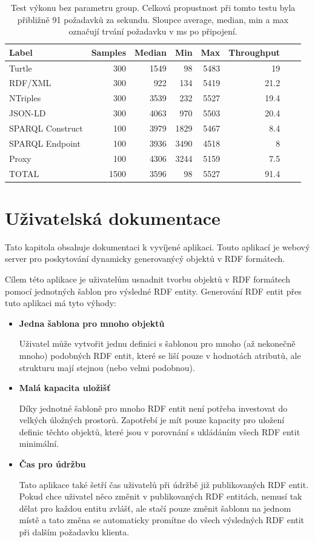 \documentclass[thesis=B,czech]{FITthesis}[2012/06/26]
\begin{document}
   \begin{table}\centering
 	\caption[Test výkonu - bez parametru group]{Test výkonu bez parametru group. Celková propustnost při tomto testu byla přibližně 91 požadavků za sekundu. Sloupce average, median, min a max označují trvání požadavku v ms po připojení.}\label{performance2}
 	\begin{tabular}{|l|r|r|r|r|r|r|r|}\hline
\textbf{Label}			& 	\textbf{Samples}&		\textbf{Median} &\textbf{Min} &	\textbf{Max} &		\textbf{Throughput} \tabularnewline \hline \hline
 Turtle				&300		&1549	&98	&5483	&19\tabularnewline \hline
 RDF/XML 			&300		&922	&134	&5419	&21.2\tabularnewline \hline
 NTriples 			&300		&3539	&232	&5527	&19.4\tabularnewline \hline
 JSON-LD 			&300		&4063	&970	&5503	&20.4\tabularnewline \hline
 SPARQL Construct 		&100		&3979	&1829	&5467	&8.4\tabularnewline \hline
 SPARQL Endpoint 		&100		&3936	&3490	&4518	&8\tabularnewline \hline
 Proxy 				&100		&4306	&3244	&5159	&7.5\tabularnewline \hline
TOTAL				&1500		&3596	&98	&5527	&91.4\tabularnewline \hline
 	\end{tabular}
 \end{table}
  
  
  \chapter{Uživatelská dokumentace}
  Tato kapitola obsahuje dokumentaci k vyvíjené aplikaci. Touto aplikací je webový server pro poskytování dynamicky generovanýcý objektů v RDF \cite{rdf} formátech.	
  
  Cílem této aplikace je uživatelům usnadnit tvorbu objektů v RDF formátech pomocí jednotných šablon pro výsledné RDF entity.
  Generování RDF entit přes tuto aplikaci má tyto výhody:
  \begin{itemize}
   \item \textbf{Jedna šablona pro mnoho objektů} 
   
   Uživatel může vytvořit jednu definici s šablonou pro mnoho (až nekonečně mnoho) podobných RDF entit, které se liší pouze v hodnotách atributů,
   ale strukturu mají stejnou (nebo velmi podobnou).
   
   \item \textbf{Malá kapacita uložišť}   
   
   Díky jednotné šabloně pro mnoho RDF entit není potřeba investovat do velkých úložných prostorů. Zapotřebí je mít pouze kapacity pro uložení
   definic těchto objektů, které jsou v porovnání s ukládáním všech RDF entit minimální.
   
   \item \textbf{Čas pro údržbu}
   
   Tato aplikace také šetří čas uživatelů při údržbě již publikovaných RDF entit. Pokud chce uživatel něco změnit v publikovaných RDF entitách, nemusí tak dělat
   pro každou entitu zvlášť, ale stačí pouze změnit šablonu na jednom místě a tato změna se automaticky promítne do všech výsledných RDF entit při
   dalším požadavku klienta.
      
  \end{itemize}
\end{document}
